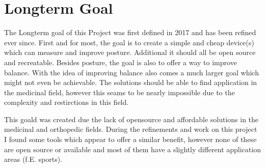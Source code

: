 \chapter*{Longterm Goal}
\label{chap:Technical Basics}
\renewcommand{\thesection}{\arabic{section}}
\setcounter{section}{0}

The Longterm goal of this Project was first defined in 2017 and has been refined ever since. First and for most, the goal is to create a simple and cheap device(s) which can measure and improve posture. Additional it should all be open source and recreatable. Besides posture, the goal is also to offer a way to improve balance. 
With the idea of improving balance also comes a much larger goal which might not even be achievable. The solutions should be able to find application in the medicinal field, however this seams to be nearly impossible due to the complexity and restirctions in this field. 

This goald was created due the lack of opensource and affordable solutions in the medicinal and orthopedic fields. During the refinements and work on this project I found some tools which appear to offer a similar benefit, however none of these are open source or available and most of them have a slightly different application areas (f.E. sports). 